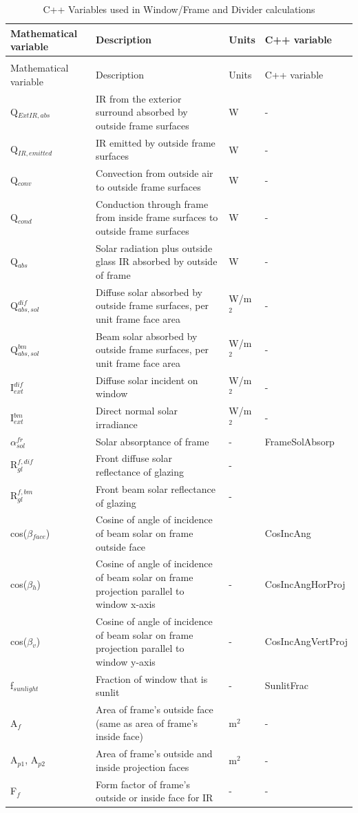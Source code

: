 \begin{longtable}[c]{p{1.0in}p{2.5in}p{1.0in}p{1.5in}}
\caption{C++ Variables used in Window/Frame and Divider calculations \label{table:c++-variables-used-in-windowframe}} \tabularnewline
\toprule 
Mathematical variable & Description & Units & C++ variable \tabularnewline
\midrule
\endfirsthead

\caption[]{C++ Variables used in Window/Frame and Divider calculations} \tabularnewline
\toprule 
Mathematical variable & Description & Units & C++ variable \tabularnewline
\midrule
\endhead

Q\(_{ExtIR,abs}\) & IR from the exterior surround absorbed by outside frame surfaces & W & - \tabularnewline
Q\(_{IR,emitted}\) & IR emitted by outside frame surfaces & W & - \tabularnewline
Q\(_{conv}\) & Convection from outside air to outside frame surfaces & W & - \tabularnewline
Q\(_{cond}\) & Conduction through frame from inside frame surfaces to outside frame surfaces & W & - \tabularnewline
Q\(_{abs}\) & Solar radiation plus outside glass IR absorbed by outside of frame & W & - \tabularnewline
Q\(^{dif}_{abs,sol}\) & Diffuse solar absorbed by outside frame surfaces, per unit frame face area & W/m\(^{2}\) & - \tabularnewline
Q\(^{bm}_{abs,sol}\) & Beam solar absorbed by outside frame surfaces, per unit frame face area & W/m\(^{2}\) & - \tabularnewline
I\(^{dif}_{ext}\) & Diffuse solar incident on window & W/m\(^{2}\) & - \tabularnewline
I\(^{bm}_{ext}\) & Direct normal solar irradiance & W/m\(^{2}\) & - \tabularnewline
$\alpha$\(^{fr}_{sol}\) & Solar absorptance of frame & - & FrameSolAbsorp \tabularnewline
R\(_{gl}^{f,dif}\) & Front diffuse solar reflectance of glazing & - & ~ \tabularnewline
R\(_{gl}^{f,bm}\) & Front beam solar reflectance of glazing & - & ~ \tabularnewline
cos($\beta$\(_{face}\)) & Cosine of angle of incidence of beam solar on frame outside face & ~ & CosIncAng \tabularnewline
cos($\beta$\(_{h}\)) & Cosine of angle of incidence of beam solar on frame projection parallel to window x-axis & - & CosIncAngHorProj \tabularnewline
cos($\beta$\(_{v}\)) & Cosine of angle of incidence of beam solar on frame projection parallel to window y-axis & - & CosIncAngVertProj \tabularnewline
f\(_{sunlight}\) & Fraction of window that is sunlit & - & SunlitFrac \tabularnewline
A\(_{f}\) & Area of frame’s outside face (same as area of frame’s inside face) & m\(^{2}\) & - \tabularnewline
A\(_{p1}\), A\(_{p2}\) & Area of frame’s outside and inside projection faces & m\(^{2}\) & - \tabularnewline
F\(_{f}\) & Form factor of frame’s outside or inside face for IR & - & - \tabularnewline

\end{longtable}
